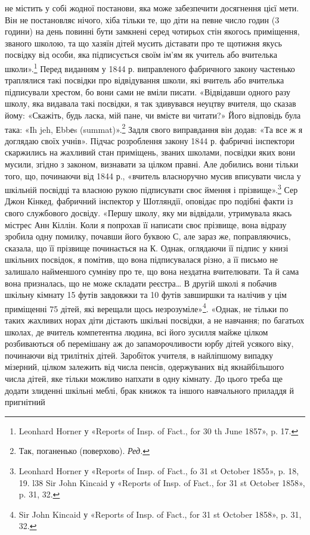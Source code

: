 \parcont{}  %
не містить у собі жодної постанови, яка може забезпечити досягнення
цієї мети. Він не постановляє нічого, хіба тільки те, що
діти на певне число годин (3 години) на день повинні бути замкнені
серед чотирьох стін якогось приміщення, званого школою, та
що хазяїн дітей мусить діставати про те щотижня якусь посвідку
від особи, яка підписується своїм ім’ям як учитель або вчителька
школи».\footnote{
Leonhard Horner у «Reports of Insp. of Fact., for 30 th June 1857»,
p. 17.
} Перед виданням у 1844 р. виправленого фабричного
закону частенько траплялися такі посвідки про відвідування
школи, які вчитель або вчителька підписували хрестом, бо вони
сами не вміли писати. «Відвідавши одного разу школу, яка видавала
такі посвідки, я так здивувався неуцтву вчителя, що сказав
йому: «Скажіть, будь ласка, мій пане, чи вмієте ви читати?»
Його відповідь була така: «Іh jeh, Еbbеs (summat)».\footnote*{
Так, поганенько (поверхово). \emph{Ред.}
} Задля свого
виправдання він додав: «Та все ж я доглядаю своїх учнів». Підчас
розроблення закону 1844 р. фабричні інспектори скаржились
на жахливий стан приміщень, званих школами, посвідки яких
вони мусили, згідно з законом, визнавати за цілком правні. Але
добились вони тільки того, що, починаючи від 1844 р., «вчитель
власноручно мусив вписувати числа у шкільній посвідці та власною
рукою підписувати своє ймення і прізвище».\footnote{
Leonhard Horner у «Reports of Insp. of Fact., fo 31 st October
1855», p. 18, 19.
l38 Sir John Kincaid у «Reports of Insp. of Fact., for 31 st October
1858», p. 31, 32.
} Сер Джон
Кінкед, фабричний інспектор у Шотляндії, оповідає про подібні
факти із свого службового досвіду. «Першу школу, яку ми відвідали,
утримувала якась містрес Анн Кіллін. Коли я попрохав її
написати своє прізвище, вона відразу зробила одну помилку,
почавши його буквою С, але зараз же, поправляючись, сказала,
що її прізвище починається на К. Однак, оглядаючи її підпис у
книзі шкільних посвідок, я помітив, що вона підписувалася різно,
а її письмо не залишало найменшого сумніву про те, що вона
нездатна вчителювати. Та й сама вона призналась, що не може
складати реєстра\dots{} В другій школі я побачив шкільну кімнату
15 футів завдовжки та 10 футів завширшки та налічив у цім приміщенні
75 дітей, які верещали щось незрозуміле»\footnote{Sir John Kincaid у
«Reports of Insp. of Fact., for 31 st October
1858», p. 31, 32.
}. «Однак,
не тільки по таких жахливих норах діти дістають шкільні посвідки,
а не навчання; по багатьох школах, де вчитель компетентна
людина, всі його зусилля майже цілком розбиваються об
перемішану аж до запаморочливости юрбу дітей усякого віку,
починаючи від трилітніх дітей. Заробіток учителя, в найліпшому
випадку мізерний, цілком залежить від числа пенсів, одержуваних
від якнайбільшого числа дітей, яке тільки можливо напхати в
одну кімнату. До цього треба ще додати злиденні шкільні меблі,
брак книжок та іншого навчального приладдя й пригнітний
\parbreak{}  %
